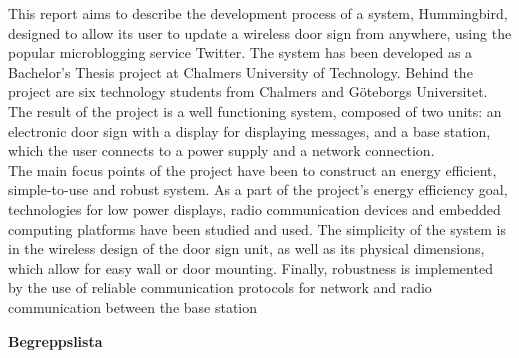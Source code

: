 \documentclass[a4paper,11pt]{article}
\begin{document}
This report aims to describe the development process of a system, Hummingbird, designed to allow its user to update a wireless door sign from anywhere, using the popular microblogging service Twitter. The system has been developed as a Bachelor’s Thesis project at Chalmers University of Technology. Behind the project are six technology students from Chalmers and Göteborgs Universitet. \\

The result of the project is a well functioning system, composed of two units: an electronic door sign with a display for displaying messages, and a base station, which the user connects to a power supply and a network connection. \\

The main focus points of the project have been to construct an energy efficient, simple-to-use and robust system. As a part of the project’s energy efficiency goal, technologies for low power displays, radio communication devices and embedded computing platforms have been studied and used. The simplicity of the system is in the wireless design of the door sign unit, as well as its physical dimensions, which allow for easy wall or door mounting. Finally, robustness is implemented by the use of reliable communication protocols for network and radio communication between the base station 

\thispagestyle{empty}
\pagebreak

\thispagestyle{empty}
\begin{center}
{\noindent \bf Begreppslista}\\
\end{center}
\end{document}
